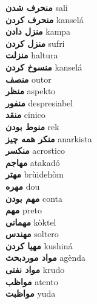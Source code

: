 \textbf{ منحرف شدن  } sali \\
\textbf{ منحرف کردن  } kanselá \\
\textbf{ منزل دادن  } kampa \\
\textbf{ منزل کردن  } sufri \\
\textbf{ منزلت  } haltura \\
\textbf{ منسوخ کردن  } kanselá \\
\textbf{ منصف  } outor \\
\textbf{ منظر  } aspekto \\
\textbf{ منفور  } despresiabel \\
\textbf{ منقد  } cinico \\
\textbf{ منوط بودن  } rek \\
\textbf{ منکر همه چیز  } anarkista \\
\textbf{ منکسر  } acrostico \\
\textbf{ مهاجم  } atakadó \\
\textbf{ مهتر  } brùidehòm \\
\textbf{ مهره  } dou \\
\textbf{ مهم بودن  } conta \\
\textbf{ مهم  } preto \\
\textbf{ مهمانی  } kòktel \\
\textbf{ مهندس  } soltero \\
\textbf{ مهیا کردن  } kushiná \\
\textbf{ مواد موردبحث  } agènda \\
\textbf{ مواد نفتی  } krudo \\
\textbf{ مواظب  } atento \\
\textbf{ مواظبت  } yuda \\
